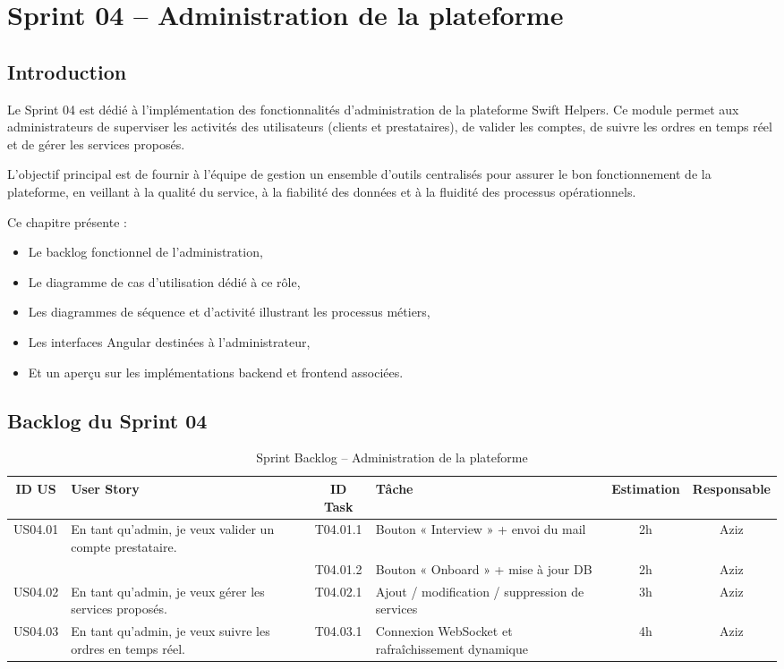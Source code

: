 \chapter{Sprint 04 – Administration de la plateforme}
\section*{Introduction}

Le Sprint 04 est dédié à l’implémentation des fonctionnalités d’administration de la plateforme Swift Helpers. Ce module permet aux administrateurs de superviser les activités des utilisateurs (clients et prestataires), de valider les comptes, de suivre les ordres en temps réel et de gérer les services proposés.

L’objectif principal est de fournir à l’équipe de gestion un ensemble d’outils centralisés pour assurer le bon fonctionnement de la plateforme, en veillant à la qualité du service, à la fiabilité des données et à la fluidité des processus opérationnels.

Ce chapitre présente :
\begin{itemize}
  \item Le backlog fonctionnel de l’administration,
  \item Le diagramme de cas d’utilisation dédié à ce rôle,
  \item Les diagrammes de séquence et d’activité illustrant les processus métiers,
  \item Les interfaces Angular destinées à l’administrateur,
  \item Et un aperçu sur les implémentations backend et frontend associées.
\end{itemize}


\section*{Backlog du Sprint 04}
\begin{table}[H]
\centering
\begin{tabular}{|c|p{4.5cm}|c|p{5cm}|c|c|}
\hline
\textbf{ID US} & \textbf{User Story} & \textbf{ID Task} & \textbf{Tâche} & \textbf{Estimation} & \textbf{Responsable} \\
\hline

US04.01 & En tant qu’admin, je veux valider un compte prestataire. 
        & T04.01.1 & Bouton « Interview » + envoi du mail & 2h & Aziz \\
        \cline{3-6}
        & & T04.01.2 & Bouton « Onboard » + mise à jour DB & 2h & Aziz \\
\hline

US04.02 & En tant qu’admin, je veux gérer les services proposés.
        & T04.02.1 & Ajout / modification / suppression de services & 3h & Aziz \\
\hline

US04.03 & En tant qu’admin, je veux suivre les ordres en temps réel.
        & T04.03.1 & Connexion WebSocket et rafraîchissement dynamique & 4h & Aziz \\
\hline
\end{tabular}
\caption{Sprint Backlog – Administration de la plateforme}
\end{table}

